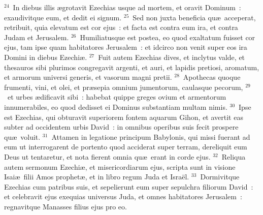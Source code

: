 ${}^{24}$~In diebus illis \ae grotavit Ezechias usque ad mortem, et oravit Dominum~: exaudivitque eum, et dedit ei signum.
${}^{25}$~Sed non juxta beneficia qu\ae\ acceperat, retribuit, quia elevatum est cor ejus~: et facta est contra eum ira, et contra Judam et Jerusalem.
${}^{26}$~Humiliatusque est postea, eo quod exaltatum fuisset cor ejus, tam ipse quam habitatores Jerusalem~: et idcirco non venit super eos ira Domini in diebus Ezechi\ae .
${}^{27}$~Fuit autem Ezechias dives, et inclytus valde, et thesauros sibi plurimos congregavit argenti, et auri, et lapidis pretiosi, aromatum, et armorum universi generis, et vasorum magni pretii.
${}^{28}$~Apothecas quoque frumenti, vini, et olei, et pr\ae sepia omnium jumentorum, caulasque pecorum,
${}^{29}$~et urbes \ae dificavit sibi~: habebat quippe greges ovium et armentorum innumerabiles, eo quod dedisset ei Dominus substantiam multam nimis.
${}^{30}$~Ipse est Ezechias, qui obturavit superiorem fontem aquarum Gihon, et avertit eas subter ad occidentem urbis David~: in omnibus operibus suis fecit prospere qu\ae\ voluit.
${}^{31}$~Attamen in legatione principum Babylonis, qui missi fuerant ad eum ut interrogarent de portento quod acciderat super terram, dereliquit eum Deus ut tentaretur, et nota fierent omnia qu\ae\ erant in corde ejus.
${}^{32}$~Reliqua autem sermonum Ezechi\ae , et misericordiarum ejus, scripta sunt in visione Isai\ae\ filii Amos prophet\ae , et in libro regum Juda et Isra\"el.
${}^{33}$~Dormivitque Ezechias cum patribus suis, et sepelierunt eum super sepulchra filiorum David~: et celebravit ejus exequias universus Juda, et omnes habitatores Jerusalem~: regnavitque Manasses filius ejus pro eo.

